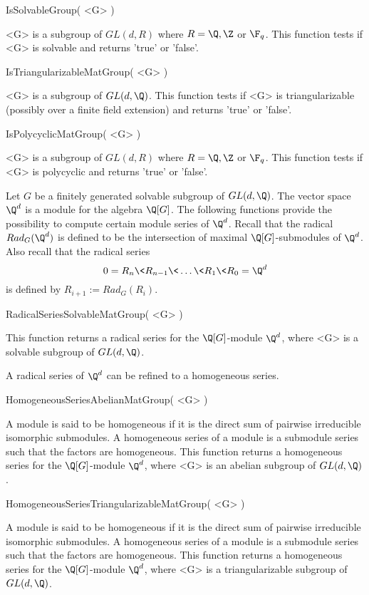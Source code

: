 \> IsSolvableGroup( <G> )

<G> is  a subgroup of $GL(d,R)$ where $R=\Q,\Z $ or $\F_q$.
This function tests if <G> is
solvable and returns 'true' or 'false'. 

\> IsTriangularizableMatGroup( <G> )

<G> is  a subgroup of $GL(d,\Q)$.
 This function tests if <G> is triangularizable 
(possibly over a finite field extension)
and returns 'true' or 'false'. 

\> IsPolycyclicMatGroup( <G> )

<G> is  a subgroup of $GL(d,R)$ where $R=\Q,\Z $ or $\F_q$.
This function tests if <G> is
polycyclic and returns 'true' or 'false'.


Let $G$ be a finitely generated solvable subgroup of $GL(d,\Q)$. The vector
space $\Q^d$ is a module for the algebra $\Q[G]$. The following
functions provide the possibility to compute certain module series of
$\Q^d$. Recall that the radical $Rad_G(\Q^d)$ is defined to be the
intersection of maximal $\Q[G]$-submodules of $\Q^d$. Also recall that the
radical series 
$$
0=R_n \< R_{n-1} \< \dots \< R_1 \< R_0=\Q^d 
$$
is defined by $R_{i+1}:= Rad_G(R_i)$. 

\> RadicalSeriesSolvableMatGroup( <G> )

This function returns a 
radical series for the $\Q[G]$-module $\Q^d$, where <G> is a
solvable subgroup of $GL(d,\Q)$.

A radical series of $\Q^d$ can be refined to a homogeneous series.

\> HomogeneousSeriesAbelianMatGroup( <G> )

A module is said to be homogeneous if it is the direct sum of pairwise
irreducible isomorphic submodules. A homogeneous series of a module 
is a submodule series such that the factors are homogeneous.
This function returns a 
homogeneous series for the $\Q[G]$-module $\Q^d$, where <G> is an
abelian subgroup of $GL(d,\Q)$.  

\> HomogeneousSeriesTriangularizableMatGroup( <G> )

A module is said to be homogeneous if it is the direct sum of pairwise
irreducible isomorphic submodules. A homogeneous series of a module 
is a submodule series such that the factors are homogeneous.
This function returns a 
homogeneous series for the $\Q[G]$-module $\Q^d$, where <G> is a
triangularizable subgroup of $GL(d,\Q)$.  

